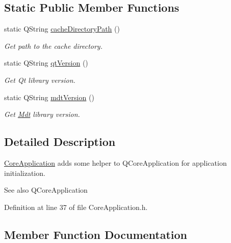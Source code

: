 \subsection*{Static Public Member Functions}
\begin{DoxyCompactItemize}
\item 
static Q\+String \hyperlink{class_mdt_1_1_core_application_aa5bf79da0eda7f8dedd2b78bf8025449}{cache\+Directory\+Path} ()
\begin{DoxyCompactList}\small\item\em Get path to the cache directory. \end{DoxyCompactList}\item 
static Q\+String \hyperlink{class_mdt_1_1_core_application_a0509073283a3a23e4ee3cf248739e15c}{qt\+Version} ()\hypertarget{class_mdt_1_1_core_application_a0509073283a3a23e4ee3cf248739e15c}{}\label{class_mdt_1_1_core_application_a0509073283a3a23e4ee3cf248739e15c}

\begin{DoxyCompactList}\small\item\em Get Qt library version. \end{DoxyCompactList}\item 
static Q\+String \hyperlink{class_mdt_1_1_core_application_a43d5e4e3b163250cba37c0071fb9f7ea}{mdt\+Version} ()\hypertarget{class_mdt_1_1_core_application_a43d5e4e3b163250cba37c0071fb9f7ea}{}\label{class_mdt_1_1_core_application_a43d5e4e3b163250cba37c0071fb9f7ea}

\begin{DoxyCompactList}\small\item\em Get \hyperlink{namespace_mdt}{Mdt} library version. \end{DoxyCompactList}\end{DoxyCompactItemize}


\subsection{Detailed Description}
\hyperlink{class_mdt_1_1_core_application}{Core\+Application} adds some helper to Q\+Core\+Application for application initialization. 

\begin{DoxySeeAlso}{See also}
Q\+Core\+Application 
\end{DoxySeeAlso}


Definition at line 37 of file Core\+Application.\+h.



\subsection{Member Function Documentation}
